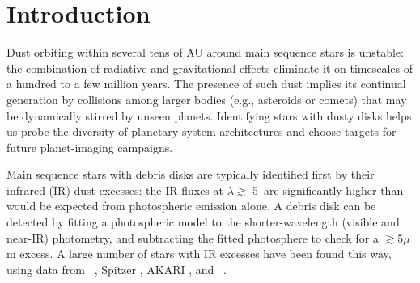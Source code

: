 


\section{Introduction}
\label{sec:intro}

   Dust orbiting within several tens of AU around main sequence stars is unstable: the combination of radiative and gravitational effects eliminate it on timescales of a hundred to a few million years. The presence of such dust implies its continual generation by collisions among larger bodies (e.g., asteroids or comets) that may be  dynamically stirred by unseen planets. Identifying stars with dusty disks helps us probe the diversity of planetary system architectures and choose targets for future planet-imaging campaigns.

	Main sequence stars with debris disks are typically identified first by their infrared (IR) dust excesses: the IR fluxes at $\lambda \gtrsim$ 5\micron\ are significantly higher than would be expected from photospheric emission alone.  A debris disk can be detected by fitting a photospheric model to the shorter-wavelength (visible and near-IR) photometry, and subtracting the fitted photosphere to check for a $\gtrsim 5 \mu$m excess.  A large number of stars with IR excesses have been found this way, using data from \iras\ \citep[e.g.,][and references therein]{Moor2006, Rhee2007, Zuckerman2001}, Spitzer \citep[e.g.,][]{Su2006, Bryden2006, Trilling2008, Carpenter2009}, AKARI \citep[e.g.,][]{Fujiwara2013}, and \WS\ \citep[e.g.,][]{Cruz-SaenzdeMiera2014, McDonald2012}.
	
	
